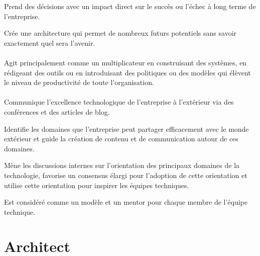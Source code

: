 \documentclass[a4paper, french, openany, 12pt]{book}
\newcommand\cha[1]{\textcolor{OliveGreen}{\textbf{\bsc{Cha-{#1}}}}}
\begin{document}
\begin{multicols}{2}
  Prend des décisions avec un impact direct sur le succès ou l'échec à long terme de l'entreprise.

  Crée une architecture qui permet de nombreux futurs potentiels sans savoir exactement quel sera l'avenir.

  \subsubsection*{\cha{TODO}}

  Agit principalement comme un multiplicateur en construisant des systèmes, en rédigeant des outils ou en introduisant 
  des politiques ou des modèles qui élèvent le niveau de productivité de toute l'organisation.

  \subsubsection*{\cha{TODO}}

  Communique l'excellence technologique de l'entreprise à l'extérieur via des conférences et des articles de blog. 

  Identifie les domaines que l'entreprise peut partager efficacement avec le monde extérieur et guide la création de 
  contenu et de communication autour de ces domaines.

  Mène les discussions internes sur l'orientation des principaux domaines de la technologie, favorise un consensus élargi
  pour l'adoption de cette orientation et utilise cette orientation pour inspirer les équipes techniques.

  Est considéré comme un modèle et un mentor pour chaque membre de l'équipe technique.

\end{multicols}

\chapter{Architect}
\end{document}
